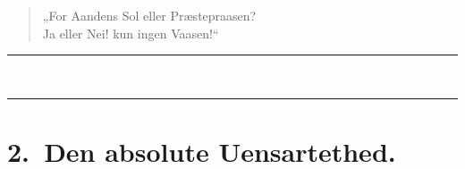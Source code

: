\begin{verse}
„For Aandens Sol eller Præstepraasen?\\
Ja eller Nei! kun ingen Vaasen!“
\end{verse}

\begin{center}
\rule{1.7cm}{0.4pt}\\[1.5pt]
\rule{1.7cm}{0.4pt}
\end{center}

\chapter*{2.\ Den absolute Uensartethed.}
\label{ch:2}

